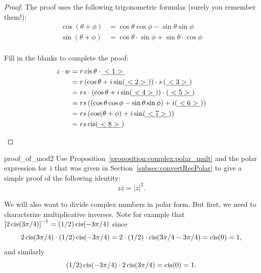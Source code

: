 \begin{proof}
The proof uses the following trigonometric formulas (surely you remember them!):
\newline
\begin{align*}
 \cos(\theta + \phi ) &= \cos\theta\cos\phi - \sin\theta\sin\phi \\
 \sin(\theta + \phi ) &= \cos\theta \cdot \sin\phi + \sin\theta \cdot \cos\phi \\
\end{align*}
\begin{exercise}{24} Fill in the blanks to complete the proof:
\begin{align*}
z \cdot w &= r\operatorname{cis}\theta \cdot \underline{~<1>~} \\
 &= r \left( \cos\theta + i \sin(\underline{~<2>~}) \right) \cdot s  \left( \underline{~<3>~} \right) \\
 &=  rs \cdot \left( \cos\theta + i \sin(\underline{~<4>~}) \right) \cdot  \left( \underline{~<5>~}\right) \\
 &=  rs \left( (\cos\theta \cos\phi   - \sin\theta \sin\phi)  + i(\underline{~<6>~}) \right)\\
 &=  rs  \left( \cos(\theta + \phi) + i\sin( \underline{~<7>~}) \right) \\
 &=  r s  \operatorname{cis}( \underline{~<8>~}) \\
\end{align*}
\end{exercise}
\end{proof}

\begin{exercise}{proof_of_mod2}
Use Proposition~\ref{proposition:complex:polar_mult} and the polar expression for $\bar{z}$ that was given in Section~\ref{subsec:convertRecPolar} to give a simple proof of the following identity:
\[ z \bar{z} = |z|^2. \]
\end{exercise}

We will also want to divide complex numbers in polar form. But first, we need to characterize multiplicative inverses. Note for example that $\left[2 \operatorname{cis} (3\pi / 4)\right]^{-1} = (1/2) \operatorname{cis} (-3 \pi/4)$ since
\[ 2 \operatorname{cis} (3\pi / 4) \cdot (1/2) \operatorname{cis} (-3 \pi/4) = 2 \cdot (1/2) \cdot \operatorname{cis}( 3\pi/4 -3 \pi /4) = \operatorname{cis}(0) = 1, \]
and similarly
\[ (1/2) \operatorname{cis} (-3 \pi/4) \cdot 2 \operatorname{cis} (3\pi / 4)  = \operatorname{cis}(0) = 1. \]


